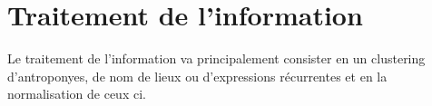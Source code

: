 \section{Traitement de l'information}

Le traitement de l'information va principalement consister en un clustering d'antroponyes, de nom de lieux ou d'expressions récurrentes  et en la normalisation de ceux ci.